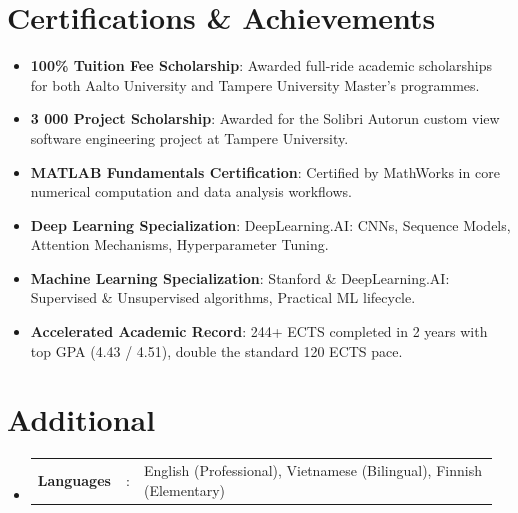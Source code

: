 \documentclass[a4paper,11pt]{article}
\newcommand{\resumeItem}[1]{
  \item\small{#1}
}
\newcommand{\resumeItemListStart}{\begin{itemize}[rightmargin=0.11in]}
\newcommand{\resumeItemListEnd}{\end{itemize}}
\newcommand{\resumeSectionType}[3]{
  \item\begin{tabular*}{0.96\textwidth}[t]{
    p{0.18\linewidth}p{0.02\linewidth}p{0.76\linewidth}
  }
    \textbf{#1} & #2 & #3
  \end{tabular*}\vspace{-2pt}
}
\newcommand{\resumeHeadingListStart}{
  \begin{itemize}[leftmargin=0.15in, label={}]
}
\newcommand{\resumeHeadingListEnd}{\end{itemize}}
\begin{document}
\section{Certifications \& Achievements}
  \resumeItemListStart{}
    \resumeItem{\textbf{100\% Tuition Fee Scholarship}: Awarded full-ride academic scholarships for both Aalto University and Tampere University Master's programmes.}
    \resumeItem{\textbf{\texteuro{}3 000 Project Scholarship}: Awarded for the Solibri Autorun custom view software engineering project at Tampere University.}
    \resumeItem{\textbf{MATLAB Fundamentals Certification}: Certified by MathWorks in core numerical computation and data analysis workflows.}
    \resumeItem{\textbf{Deep Learning Specialization}: DeepLearning.AI: CNNs, Sequence Models, Attention Mechanisms, Hyperparameter Tuning.}
    \resumeItem{\textbf{Machine Learning Specialization}: Stanford \& DeepLearning.AI: Supervised \& Unsupervised algorithms, Practical ML lifecycle.}
    \resumeItem{\textbf{Accelerated Academic Record}: 244+ ECTS completed in 2 years with top GPA (4.43 / 4.51), double the standard 120 ECTS pace.}
  \resumeItemListEnd{}

\section{Additional}
  \resumeHeadingListStart{}
    \resumeSectionType{Languages}{:}{English (Professional), Vietnamese (Bilingual), Finnish (Elementary)}
  \resumeHeadingListEnd{}
\end{document}
